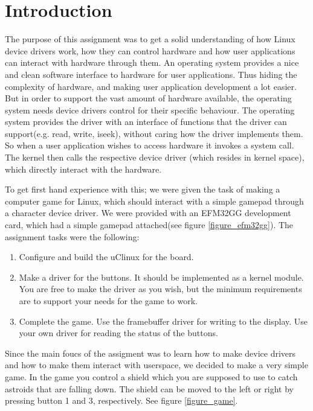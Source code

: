 \section{Introduction}

The purpose of this assignment was to get a solid understanding of how Linux device drivers work, how they can control hardware and how user applications can interact with hardware through them. An operating system provides a nice and clean software interface to hardware for user applications. Thus hiding the complexity of hardware, and making user application development a lot easier. But in order to support the vast amount of hardware available, the operating system needs device drivers control for their specific behaviour. The operating system provides the driver with an interface of functions that the driver can support(e.g. read, write, iseek), without caring how the driver implements them. So when a user application wishes to access hardware it invokes a system call. The kernel then calls the respective device driver (which resides in kernel space), which directly interact with the hardware. 

To get first hand experience with this; we were given the task of making a computer game for Linux, which should interact with a simple gamepad through a character device driver. We were provided with an EFM32GG development card, which had a simple gamepad attached(see figure \ref{figure_efm32gg}). The assignment tasks were the following\cite{compendium}:

\begin{enumerate}
	\item Configure and build the uClinux for the board.
	\item Make a driver for the buttons. It should be implemented as a kernel module. You are
	free to make the driver as you wish, but the minimum requirements are to support your
	needs for the game to work.
	\item Complete the game. Use the framebuffer driver for writing to the display. Use your own
	driver for reading the status of the buttons.
\end{enumerate}

Since the main foucs of the assigment was to learn how to make device drivers and how to make them interact with userspace, we decided to make a very simple game. In the game you control a shield which you are supposed to use to catch astroids that are falling down. The shield can be moved to the left or right by pressing button 1 and 3, respectively. See figure \ref{figure_game}. 

